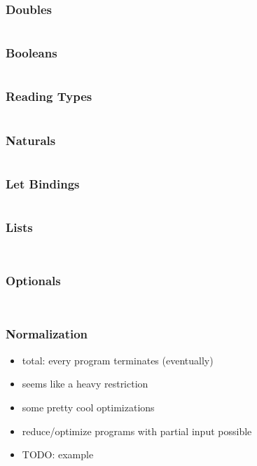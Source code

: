 \documentclass{beamer}
\begin{document}
 \begin{frame}[fragile]
   \frametitle{Doubles}
   \inputminted{text}{static-source/ints.out}
 \end{frame}

 \begin{frame}[fragile]
   \frametitle{Booleans}
   \inputminted{text}{static-source/bools.out}
 \end{frame}

 \begin{frame}[fragile]
   \frametitle{Reading Types}
   \inputminted{text}{static-source/types.out}
 \end{frame}

 \begin{frame}[fragile]
   \frametitle{Naturals}
   \inputminted{text}{static-source/nats.out}
 \end{frame}

 \begin{frame}[fragile]
   \frametitle{Let Bindings}
   \inputminted{text}{dhall/lets.dhall}
 \end{frame}

 \begin{frame}[fragile]
   \frametitle{Lists}
   \inputminted{text}{static-source/lists.out}
   \inputminted{text}{dhall/list-fold.dhall}
 \end{frame}

 \begin{frame}[fragile]
   \frametitle{Optionals}
   \inputminted{text}{static-source/optionals.out}
   \inputminted[fontsize=\footnotesize]{text}{dhall/optional-fold.dhall}
 \end{frame}

 \begin{frame}
   \frametitle{Normalization}
   \begin{itemize}
   \item total: every program terminates (eventually)
   \item seems like a heavy restriction
   \item some pretty cool optimizations
   \item reduce/optimize programs with partial input possible
   \item TODO: example
   \end{itemize}
 \end{frame}
\end{document}
